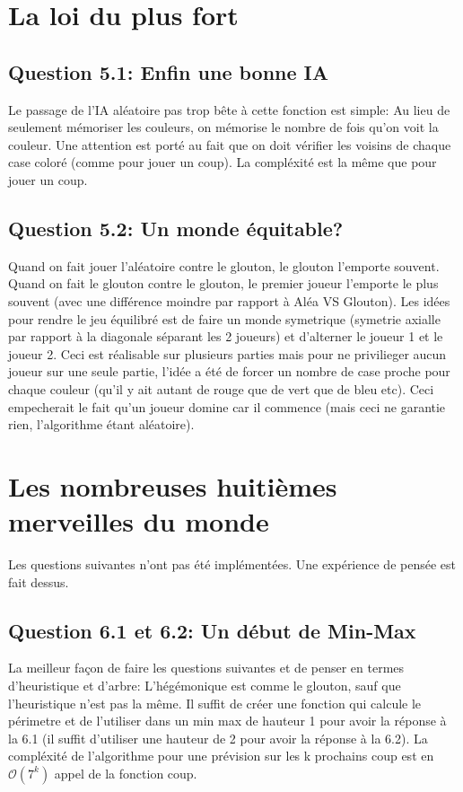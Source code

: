 \documentclass{article}
\begin{document}
    \section{La loi du plus fort}

    \subsection{Question 5.1: Enfin une bonne IA}

    Le passage de l'IA aléatoire pas trop bête à cette fonction est simple: Au lieu de seulement mémoriser les couleurs, on mémorise le nombre de fois qu'on voit la couleur. Une attention est porté au fait que on doit vérifier les voisins de chaque case coloré (comme pour jouer un coup). La compléxité est la même que pour jouer un coup.

    \subsection{Question 5.2: Un monde équitable?}

    Quand on fait jouer l'aléatoire contre le glouton, le glouton l'emporte souvent. Quand on fait le glouton contre le glouton, le premier joueur l'emporte le plus souvent (avec une différence moindre par rapport à Aléa VS Glouton). Les idées pour rendre le jeu équilibré est de faire un monde symetrique (symetrie axialle par rapport à la diagonale séparant les 2 joueurs) et d'alterner le joueur 1 et le joueur 2. Ceci est réalisable sur plusieurs parties mais pour ne privilieger aucun joueur sur une seule partie, l'idée a été de forcer un nombre de case proche pour chaque couleur (qu'il y ait autant de rouge que de vert que de bleu etc). Ceci empecherait le fait qu'un joueur domine car il commence (mais ceci ne garantie rien, l'algorithme étant aléatoire).

    \section{Les nombreuses huitièmes merveilles du monde}

    Les questions suivantes n'ont pas été implémentées. Une expérience de pensée est fait dessus.

    \subsection{Question 6.1 et 6.2: Un début de Min-Max}

    La meilleur façon de faire les questions suivantes et de penser en termes d'heuristique et d'arbre: L'hégémonique est comme le glouton, sauf que l'heuristique n'est pas la même. Il suffit de créer une fonction qui calcule le périmetre et de l'utiliser dans un min max de hauteur 1 pour avoir la réponse à la 6.1 (il suffit d'utiliser une hauteur de 2 pour avoir la réponse à la 6.2). La compléxité de l'algorithme pour une prévision sur les k prochains coup est en $\mathcal{O}(7^k)$ appel de la fonction coup.
\end{document}
